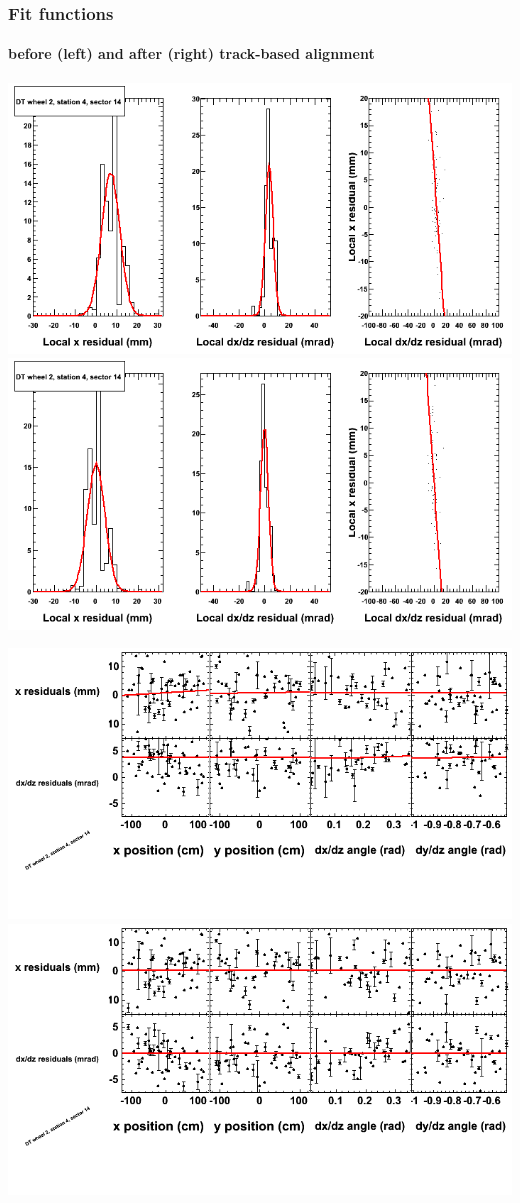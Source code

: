 \documentclass[compress]{beamer}
\begin{document}
\begin{frame}
\frametitle{Fit functions}
\framesubtitle{before (left) and after (right) track-based alignment}
\includegraphics[width=0.5\linewidth]{fitfunctions_re01/MBwhEst4sec14_bellcurves.png} \includegraphics[width=0.5\linewidth]{fitfunctions_re05/MBwhEst4sec14_bellcurves.png}

\includegraphics[width=0.5\linewidth]{fitfunctions_re01/MBwhEst4sec14_polynomials.png} \includegraphics[width=0.5\linewidth]{fitfunctions_re05/MBwhEst4sec14_polynomials.png}
\end{frame}
\end{document}
